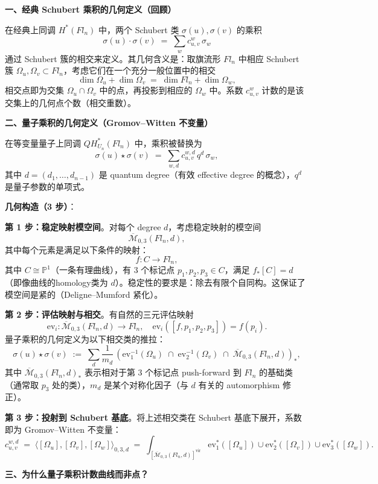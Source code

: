 \textbf{一、经典 Schubert 乘积的几何定义（回顾）}

在经典上同调 $H^*(Fl_n)$ 中，两个 Schubert 类 $\sigma(u), \sigma(v)$ 的乘积
$$\sigma(u) \cdot \sigma(v) \;=\; \sum_w c_{u,v}^w \, \sigma_w$$
通过 Schubert 簇的相交来定义。其几何含义是：取旗流形 $Fl_n$ 中相应 Schubert 簇 $\Omega_u, \Omega_v \subset Fl_n$，考虑它们在一个充分一般位置中的相交
$$\dim \Omega_u + \dim \Omega_v \;=\; \dim Fl_n + \dim \Omega_w,$$
相交点即为交集 $\Omega_u \cap \Omega_v$ 中的点，再投影到相应的 $\Omega_w$ 中。系数 $c_{u,v}^w$ 计数的是该交集上的几何点个数（相交重数）。

\textbf{二、量子乘积的几何定义（Gromov--Witten 不变量）}

在等变量量子上同调 $QH_{U_n}^*(Fl_n)$ 中，乘积被替换为
$$\sigma(u) \star \sigma(v) \;=\; \sum_{w, d} c_{u,v}^{w,d} \, q^d \, \sigma_w,$$
其中 $d = (d_1, \ldots, d_{n-1})$ 是 quantum degree（有效 effective degree 的概念），$q^d$ 是量子参数的单项式。

\textbf{几何构造（3 步）}：

\textbf{第 1 步：稳定映射模空间}。对每个 degree $d$，考虑稳定映射的模空间
$$\overline{\mathcal{M}}_{0,3}(Fl_n, d),$$
其中每个元素是满足以下条件的映射：
$$f : C \to Fl_n,$$
其中 $C \cong \mathbb{P}^1$（一条有理曲线），有 3 个标记点 $p_1, p_2, p_3 \in C$，满足 $f_*[C] = d$（即像曲线的homology类为 $d$）。稳定性的要求是：除去有限个自同构。这保证了模空间是紧的（Deligne--Mumford 紧化）。

\textbf{第 2 步：评估映射与相交}。有自然的三元评估映射
$$\mathrm{ev}_i : \overline{\mathcal{M}}_{0,3}(Fl_n, d) \to Fl_n, \quad \mathrm{ev}_i([f, p_1, p_2, p_3]) = f(p_i).$$
量子乘积的几何定义为以下相交类的推拉：
$$\sigma(u) \star \sigma(v) \;:=\; \sum_d \frac{1}{m_d} \, (\mathrm{ev}_1^{-1}(\Omega_u) \;\cap\; \mathrm{ev}_2^{-1}(\Omega_v) \;\cap\; \overline{\mathcal{M}}_{0,3}(Fl_n, d))_*,$$
其中 $\overline{\mathcal{M}}_{0,3}(Fl_n, d)_*$ 表示相对于第 3 个标记点 push-forward 到 $Fl_n$ 的基础类（通常取 $p_3$ 处的类），$m_d$ 是某个对称化因子（与 $d$ 有关的 automorphism 修正）。

\textbf{第 3 步：投射到 Schubert 基底}。将上述相交类在 Schubert 基底下展开，系数即为 Gromov--Witten 不变量：
$$c_{u,v}^{w,d} \;=\; \langle [\Omega_u], [\Omega_v], [\Omega_w] \rangle_{0,3,d} \;=\; \int_{[\overline{\mathcal{M}}_{0,3}(Fl_n, d)]^{\mathrm{vir}}} \mathrm{ev}_1^*([\Omega_u]) \cup \mathrm{ev}_2^*([\Omega_v]) \cup \mathrm{ev}_3^*([\Omega_w]).$$

\textbf{三、为什么量子乘积计数曲线而非点？}

